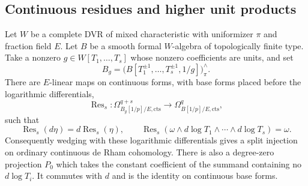 \subsection{Continuous residues and higher unit products}

\begin{lemma}
\label{d3:lem:continuouslaurentresidue}
Let $W$ be a complete DVR of mixed characteristic with uniformizer
$\pi$ and fraction field $E$. Let $B$ be a smooth formal $W$-algebra
of topologically finite type. Take a nonzero
$g\in W[T_1,\ldots,T_s]$ whose nonzero coefficients are units, and set
\[
 B_g=\bigl(B[T_1^{\pm1},\ldots,T_s^{\pm1},1/g]\bigr)^{\wedge}_{\pi}.
\]
There are $E$-linear maps on continuous forms, with base forms
placed before the logarithmic differentials,
\[
 \operatorname{Res}_s:
 \Omega^{q+s}_{B_g[1/p]/E,\mathrm{cts}}
       \longrightarrow\Omega^q_{B[1/p]/E,\mathrm{cts}},
\]
such that
\[
 \operatorname{Res}_s(d\eta)=d\operatorname{Res}_s(\eta),\qquad
 \operatorname{Res}_s\left(
 \omega\wedge d\log T_1\wedge\cdots\wedge d\log T_s\right)=\omega.
\]
Consequently wedging with these logarithmic differentials gives
a split injection on ordinary continuous de Rham cohomology.
There is also a degree-zero projection $P_0$ which takes the
constant coefficient of the summand containing no $d\log T_i$.
It commutes with $d$ and is the identity on continuous base forms.
\end{lemma}

